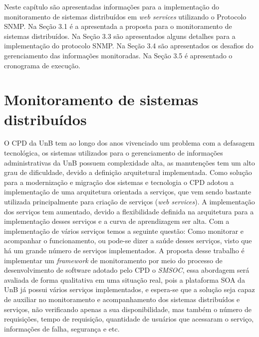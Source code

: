 \label{monitoramento_servicos}

Neste capítulo são apresentadas informações para a implementação do monitoramento de sistemas distribuídos em \textit{web services} utilizando o Protocolo SNMP. Na Seção 3.1 é a apresentada a proposta para o monitoramento de sistemas distribuídos. Na Seção 3.3 são apresentados alguns detalhes para a implementação do protocolo SNMP. Na Seção 3.4 são apresentados os desafios do gerenciamento das informações monitoradas. Na Seção 3.5 é apresentado o cronograma de execução.

\section{Monitoramento de sistemas distribuídos}%

O CPD da \acrlong{UnB} tem ao longo dos anos vivenciado um problema com a defasagem tecnológica, os sistemas utilizados para o gerenciamento de informações administrativas da UnB possuem complexidade alta, as manutenções tem um alto grau de dificuldade, devido a definição arquitetural implementada. Como solução para a modernização e migração dos sistemas e tecnologia o CPD adotou a implementação de uma arquitetura orientada a serviços, que vem sendo bastante utilizada principalmente para criação de serviços (\textit{web services}). A implementação dos serviços tem aumentado, devido a flexibilidade definida na arquitetura para a implementação desses serviços e a curva de aprendizagem ser alta. Com a implementação de vários serviços temos a seguinte questão: Como monitorar e acompanhar o funcionamento, ou pode-se dizer a saúde desses serviços, visto que há um grande número de serviços implementados. A proposta desse trabalho é implementar um \textit{framework} de monitoramento por meio do processo de desenvolvimento de software adotado pelo \acrshort{CPD} o \textit{\acrfull{SMSOC}}\cite{Agilar}, essa abordagem será avaliada de forma qualitativa em uma situação real, pois a plataforma \acrshort{SOA} da \acrshort{UnB} já possui vários serviços implementados, e espera-se que a solução seja capaz de auxiliar no monitoramento e acompanhamento dos sistemas distribuídos e serviços, não verificando apenas a sua disponibilidade, mas também o número de requisições, tempo de requisição, quantidade de usuários que acessaram o serviço, informações de falha, segurança e etc.            

